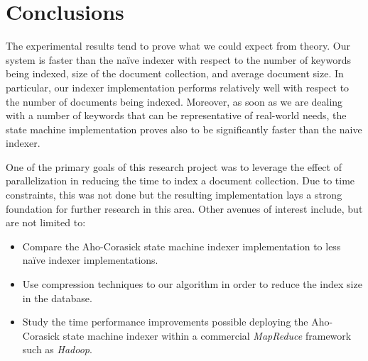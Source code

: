 \documentclass[10pt]{report}
\begin{document}
\section{Conclusions}
\label{sec:conclusions}
The experimental results tend to prove what we could expect from
theory. Our system is faster than the na\"{i}ve indexer with respect
to the number of keywords being indexed, size of the document
collection, and average document size. In particular, our indexer
implementation performs relatively well with respect to the number of
documents being indexed. Moreover, as soon as we are dealing with a number of
keywords that can be representative of real-world needs, the state
machine implementation proves also to be significantly faster than the
naive indexer. 

One of the primary goals of this research project was to leverage the
effect of parallelization in reducing the time to index a document
collection. Due to time constraints, this was not done but the
resulting implementation lays a strong foundation for further research
in this area. Other avenues of interest include, but are not limited
to:

\begin{itemize}
  \item Compare the Aho-Corasick state machine indexer implementation
    to less na\"{i}ve indexer implementations.
    
    \item Use compression techniques to our algorithm in order to
      reduce the index size in the database.

    \item Study the time performance improvements possible deploying
      the Aho-Corasick state machine indexer within a commercial
      \textit{MapReduce} framework such as \textit{Hadoop}.
\end{itemize}



\renewcommand\bibname{References}




\end{document}
